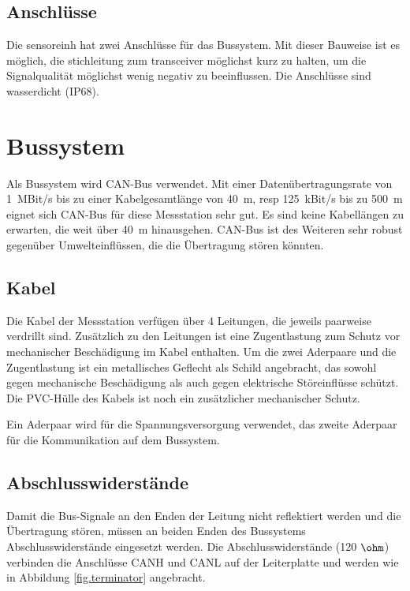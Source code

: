 \subsection{Anschlüsse}
Die \gls{sensoreinh} hat zwei Anschlüsse für das Bussystem. Mit dieser Bauweise ist es möglich, die \gls{stichleitung} zum \gls{transceiver} möglichst kurz zu halten, um die Signalqualität möglichst wenig negativ zu beeinflussen. Die Anschlüsse sind wasserdicht (IP68).














\section{Bussystem}\label{sec.manualbus}
Als Bussystem wird CAN-Bus verwendet. Mit einer Datenübertragungsrate von 1~MBit/s bis zu einer Kabelgesamtlänge von 40~m, resp 125~kBit/s bis zu 500~m eignet sich CAN-Bus für diese Messstation sehr gut. Es sind keine Kabellängen zu erwarten, die weit über 40~m hinausgehen. CAN-Bus ist des Weiteren sehr robust gegenüber Umwelteinflüssen, die die Übertragung stören könnten.

\subsection{Kabel}
Die Kabel der Messstation verfügen über 4 Leitungen, die jeweils paarweise verdrillt sind. Zusätzlich zu den Leitungen ist eine Zugentlastung zum Schutz vor mechanischer Beschädigung im Kabel enthalten. Um die zwei Aderpaare und die Zugentlastung ist ein metallisches Geflecht als Schild angebracht, das sowohl gegen mechanische Beschädigung als auch gegen elektrische Störeinflüsse schützt. Die PVC-Hülle des Kabels ist noch ein zusätzlicher mechanischer Schutz. 

Ein Aderpaar wird für die Spannungsversorgung verwendet, das zweite Aderpaar für die Kommunikation auf dem Bussystem.

\subsection{Abschlusswiderstände}
Damit die Bus-Signale an den Enden der Leitung nicht reflektiert werden und die Übertragung stören, müssen an beiden Enden des Bussystems Abschlusswiderstände eingesetzt werden.  Die Abschlusswiderstände (120 \ensuremath{\ohm}) verbinden die Anschlüsse CANH und CANL auf der Leiterplatte und werden wie in Abbildung \ref{fig.terminator} angebracht.

